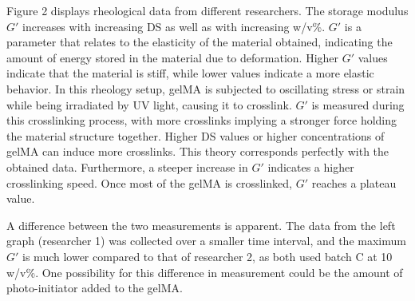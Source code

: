 Figure 2 displays rheological data from different researchers. The storage modulus $G'$ increases with increasing DS as well as with increasing w/v\%. $G'$ is a parameter that relates to the elasticity of the material obtained, indicating the amount of energy stored in the material due to deformation. Higher $G'$ values indicate that the material is stiff, while lower values indicate a more elastic behavior. In this rheology setup, gelMA is subjected to oscillating stress or strain while being irradiated by UV light, causing it to crosslink. $G'$ is measured during this crosslinking process, with more crosslinks implying a stronger force holding the material structure together. Higher DS values or higher concentrations of gelMA can induce more crosslinks. This theory corresponds perfectly with the obtained data. Furthermore, a steeper increase in $G'$ indicates a higher crosslinking speed. Once most of the gelMA is crosslinked, $G'$ reaches a plateau value.

A difference between the two measurements is apparent. The data from the left graph (researcher 1) was collected over a smaller time interval, and the maximum $G'$ is much lower compared to that of researcher 2, as both used batch C at 10 w/v\%. One possibility for this difference in measurement could be the amount of photo-initiator added to the gelMA. 

